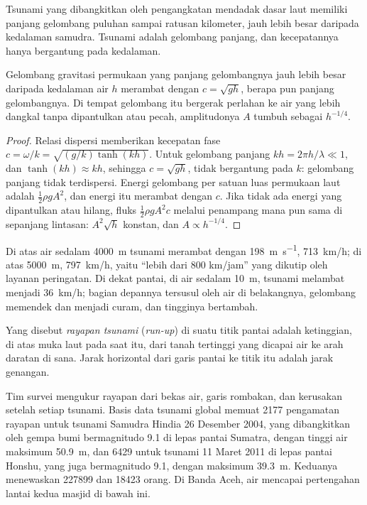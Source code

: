 Tsunami yang dibangkitkan oleh pengangkatan mendadak dasar laut memiliki panjang gelombang puluhan sampai ratusan
kilometer, jauh lebih besar daripada kedalaman samudra. Tsunami adalah gelombang panjang, dan kecepatannya hanya bergantung
pada kedalaman.

\begin{proposition}\label{prop:b2:geological-hazards:long-waves}
Gelombang gravitasi permukaan yang panjang gelombangnya jauh lebih besar daripada kedalaman air $h$ merambat dengan
$c = \sqrt{gh}$, berapa pun panjang gelombangnya. Di tempat gelombang itu bergerak perlahan ke air yang lebih dangkal tanpa
dipantulkan atau pecah, amplitudonya $A$ tumbuh sebagai $h^{-1/4}$.
\end{proposition}

\begin{proof}
Relasi dispersi memberikan kecepatan fase $c = \omega/k = \sqrt{(g/k)\tanh(kh)}$. Untuk gelombang
panjang $kh = 2\pi h/\lambda \ll 1$, dan $\tanh(kh) \approx kh$, sehingga $c = \sqrt{gh}$, tidak bergantung pada
$k$: gelombang panjang tidak terdispersi. Energi gelombang per satuan luas permukaan laut adalah $\frac12
\rho g A^2$, dan energi itu merambat dengan $c$. Jika tidak ada energi yang dipantulkan atau hilang, fluks $\frac12\rho g A^2
c$ melalui penampang mana pun sama di sepanjang lintasan: $A^2 \sqrt{h}$ konstan, dan $A \propto
h^{-1/4}$.
\end{proof}

Di atas air sedalam \qty{4000}{m} tsunami merambat dengan \qty{198}{m.s^{-1}}, \qty{713}{km/h}; di atas
\qty{5000}{m}, \qty{797}{km/h}, yaitu ``lebih dari 800 km/jam'' yang dikutip oleh layanan peringatan. Di dekat
pantai, di air sedalam \qty{10}{m}, tsunami melambat menjadi \qty{36}{km/h}; bagian depannya tersusul oleh air
di belakangnya, gelombang memendek dan menjadi curam, dan tingginya bertambah.

\begin{definition}\label{def:b2:geological-hazards:tsunami}
Yang disebut \emph{rayapan tsunami} (\textit{run-up}) di suatu titik pantai adalah ketinggian, di atas
muka laut pada saat itu, dari tanah tertinggi yang dicapai air ke arah daratan di sana. Jarak horizontal
dari garis pantai ke titik itu adalah jarak genangan.
\end{definition}

Tim survei mengukur rayapan dari bekas air, garis rombakan, dan kerusakan setelah setiap tsunami. Basis
data tsunami global memuat \num{2177} pengamatan rayapan untuk tsunami Samudra Hindia
26 Desember 2004, yang dibangkitkan oleh gempa bumi bermagnitudo 9.1 di lepas pantai Sumatra, dengan tinggi air maksimum
\qty{50.9}{m}, dan \num{6429} untuk tsunami 11 Maret 2011 di lepas pantai Honshu, yang juga bermagnitudo 9.1,
dengan maksimum \qty{39.3}{m}. Keduanya menewaskan \num{227899} dan \num{18423} orang. Di Banda Aceh,
air mencapai pertengahan lantai kedua masjid di bawah ini.

